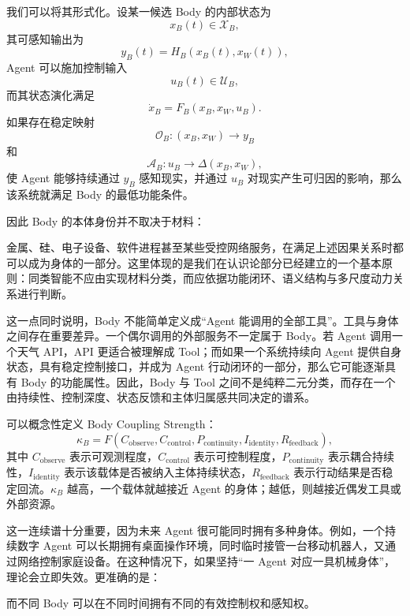 我们可以将其形式化。设某一候选 Body 的内部状态为
\[
x_B(t)\in\mathcal X_B,
\]
其可感知输出为
\[
y_B(t)
=
H_B
\left(
x_B(t),
x_W(t)
\right),
\]
Agent 可以施加控制输入
\[
u_B(t)\in\mathcal U_B,
\]
而其状态演化满足
\[
\dot{x}_B
=
F_B
\left(
x_B,
x_W,
u_B
\right).
\]
如果存在稳定映射
\[
\mathcal O_B:
(x_B,x_W)
\rightarrow
y_B
\]
和
\[
\mathcal A_B:
u_B
\rightarrow
\Delta(x_B,x_W),
\]
使 Agent 能够持续通过 $y_B$ 感知现实，并通过 $u_B$ 对现实产生可归因的影响，那么该系统就满足 Body 的最低功能条件。

因此 Body 的本体身份并不取决于材料：
\begin{statementbox}
\centering
{}
\end{statementbox}
金属、硅、电子设备、软件进程甚至某些受控网络服务，在满足上述因果关系时都可以成为身体的一部分。这里体现的是我们在认识论部分已经建立的一个基本原则：同类智能不应由实现材料分类，而应依据功能闭环、语义结构与多尺度动力关系进行判断。

这一点同时说明，Body 不能简单定义成“Agent 能调用的全部工具”。工具与身体之间存在重要差异。一个偶尔调用的外部服务不一定属于 Body。若 Agent 调用一个天气 API，API 更适合被理解成 Tool；而如果一个系统持续向 Agent 提供自身状态，具有稳定控制接口，并成为 Agent 行动闭环的一部分，那么它可能逐渐具有 Body 的功能属性。因此，Body 与 Tool 之间不是纯粹二元分类，而存在一个由持续性、控制深度、状态反馈和主体归属感共同决定的谱系。

可以概念性定义 Body Coupling Strength：
\[
\kappa_B
=
F
\left(
C_{\mathrm{observe}},
C_{\mathrm{control}},
P_{\mathrm{continuity}},
I_{\mathrm{identity}},
R_{\mathrm{feedback}}
\right),
\]
其中 $C_{\mathrm{observe}}$ 表示可观测程度，$C_{\mathrm{control}}$ 表示可控制程度，$P_{\mathrm{continuity}}$ 表示耦合持续性，$I_{\mathrm{identity}}$ 表示该载体是否被纳入主体持续状态，$R_{\mathrm{feedback}}$ 表示行动结果是否稳定回流。$\kappa_B$ 越高，一个载体就越接近 Agent 的身体；越低，则越接近偶发工具或外部资源。

这一连续谱十分重要，因为未来 Agent 很可能同时拥有多种身体。例如，一个持续数字 Agent 可以长期拥有桌面操作环境，同时临时接管一台移动机器人，又通过网络控制家庭设备。在这种情况下，如果坚持“一 Agent 对应一具机械身体”，理论会立即失效。更准确的是：
\begin{statementbox}
\centering
{}
\end{statementbox}
而不同 Body 可以在不同时间拥有不同的有效控制权和感知权。

